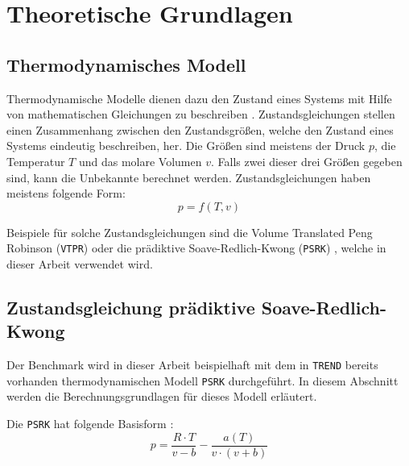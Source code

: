 \documentclass[../thesis.tex]{subfiles}
\begin{document}
	
\makeatletter %
\makeatother

\chapter{Theoretische Grundlagen}
\label{chp: grundlagen}

\section{Thermodynamisches Modell}

Thermodynamische Modelle dienen dazu den Zustand eines Systems mit Hilfe von mathematischen Gleichungen zu beschreiben \cite{atkins2006atkins}. Zustandsgleichungen stellen einen Zusammenhang zwischen den Zustandsgrößen, welche den Zustand eines Systems eindeutig beschreiben, her. Die Größen sind meistens der Druck $p$, die Temperatur $T$ und das molare Volumen $v$. Falls zwei dieser drei Größen gegeben sind, kann die Unbekannte berechnet werden. Zustandsgleichungen haben meistens folgende Form:
\begin{equation}
	p = f(T,v)
\end{equation}

Beispiele für solche Zustandsgleichungen sind die Volume Translated Peng Robinson (\texttt{VTPR}) \cite{ahlers2002development} oder die prädiktive Soave-Redlich-Kwong (\texttt{PSRK}) \cite{HOLDERBAUM1991251}, welche in dieser Arbeit verwendet wird.

\section{Zustandsgleichung prädiktive Soave-Redlich-Kwong}

Der Benchmark wird in dieser Arbeit beispielhaft mit dem in \texttt{TREND} bereits vorhanden thermodynamischen Modell \texttt{PSRK} durchgeführt. In diesem Abschnitt werden die Berechnungsgrundlagen für dieses Modell erläutert.

Die \texttt{PSRK} hat folgende Basisform \cite{HOLDERBAUM1991251}:
\begin{equation}
	p = \dfrac{R \cdot T}{v - b}- \dfrac{a(T)}{v \cdot (v + b)}
\end{equation}
\end{document}
